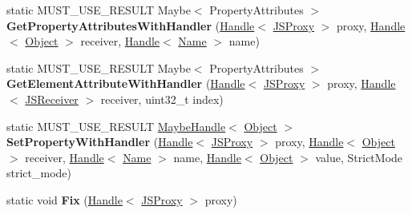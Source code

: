 \begin{DoxyCompactItemize}
\item 
\hypertarget{classv8_1_1internal_1_1_j_s_proxy_ab09ea0fd2d4c53b7fa2fefea768cb899}{}static M\+U\+S\+T\+\_\+\+U\+S\+E\+\_\+\+R\+E\+S\+U\+L\+T Maybe$<$ Property\+Attributes $>$ {\bfseries Get\+Property\+Attributes\+With\+Handler} (\hyperlink{classv8_1_1internal_1_1_handle}{Handle}$<$ \hyperlink{classv8_1_1internal_1_1_j_s_proxy}{J\+S\+Proxy} $>$ proxy, \hyperlink{classv8_1_1internal_1_1_handle}{Handle}$<$ \hyperlink{classv8_1_1internal_1_1_object}{Object} $>$ receiver, \hyperlink{classv8_1_1internal_1_1_handle}{Handle}$<$ \hyperlink{classv8_1_1internal_1_1_name}{Name} $>$ name)\label{classv8_1_1internal_1_1_j_s_proxy_ab09ea0fd2d4c53b7fa2fefea768cb899}

\item 
\hypertarget{classv8_1_1internal_1_1_j_s_proxy_ac5706a0a5e23decbb6b8e2ad293a1195}{}static M\+U\+S\+T\+\_\+\+U\+S\+E\+\_\+\+R\+E\+S\+U\+L\+T Maybe$<$ Property\+Attributes $>$ {\bfseries Get\+Element\+Attribute\+With\+Handler} (\hyperlink{classv8_1_1internal_1_1_handle}{Handle}$<$ \hyperlink{classv8_1_1internal_1_1_j_s_proxy}{J\+S\+Proxy} $>$ proxy, \hyperlink{classv8_1_1internal_1_1_handle}{Handle}$<$ \hyperlink{classv8_1_1internal_1_1_j_s_receiver}{J\+S\+Receiver} $>$ receiver, uint32\+\_\+t index)\label{classv8_1_1internal_1_1_j_s_proxy_ac5706a0a5e23decbb6b8e2ad293a1195}

\item 
\hypertarget{classv8_1_1internal_1_1_j_s_proxy_ad016f027a105f86b15454999b7dc9a52}{}static M\+U\+S\+T\+\_\+\+U\+S\+E\+\_\+\+R\+E\+S\+U\+L\+T \hyperlink{classv8_1_1internal_1_1_maybe_handle}{Maybe\+Handle}$<$ \hyperlink{classv8_1_1internal_1_1_object}{Object} $>$ {\bfseries Set\+Property\+With\+Handler} (\hyperlink{classv8_1_1internal_1_1_handle}{Handle}$<$ \hyperlink{classv8_1_1internal_1_1_j_s_proxy}{J\+S\+Proxy} $>$ proxy, \hyperlink{classv8_1_1internal_1_1_handle}{Handle}$<$ \hyperlink{classv8_1_1internal_1_1_object}{Object} $>$ receiver, \hyperlink{classv8_1_1internal_1_1_handle}{Handle}$<$ \hyperlink{classv8_1_1internal_1_1_name}{Name} $>$ name, \hyperlink{classv8_1_1internal_1_1_handle}{Handle}$<$ \hyperlink{classv8_1_1internal_1_1_object}{Object} $>$ value, Strict\+Mode strict\+\_\+mode)\label{classv8_1_1internal_1_1_j_s_proxy_ad016f027a105f86b15454999b7dc9a52}

\item 
\hypertarget{classv8_1_1internal_1_1_j_s_proxy_af71a57abca0e120a0977847c46decd4e}{}static void {\bfseries Fix} (\hyperlink{classv8_1_1internal_1_1_handle}{Handle}$<$ \hyperlink{classv8_1_1internal_1_1_j_s_proxy}{J\+S\+Proxy} $>$ proxy)\label{classv8_1_1internal_1_1_j_s_proxy_af71a57abca0e120a0977847c46decd4e}


\end{DoxyCompactItemize}
